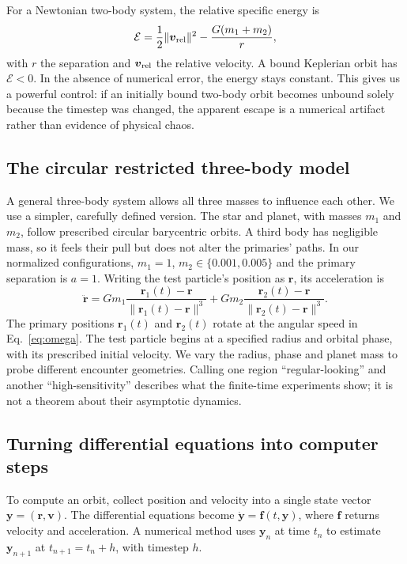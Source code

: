 \documentclass[10pt,letterpaper,twocolumn]{article}
\begin{document}
For a Newtonian two-body system, the relative specific energy is
\begin{equation}\label{eq:energy}
 \mathcal E=\frac12\lVert\boldsymbol v_{\rm rel}\rVert^2
       -\frac{G(m_1+m_2)}{r},
\end{equation}
with $r$ the separation and $\boldsymbol v_{\rm rel}$ the relative velocity. A bound Keplerian orbit has $\mathcal E<0$. In the absence of numerical error, the energy stays constant. This gives us a powerful control: if an initially bound two-body orbit becomes unbound solely because the timestep was changed, the apparent escape is a numerical artifact rather than evidence of physical chaos.

\subsection{The circular restricted three-body model}
A general three-body system allows all three masses to influence each other. We use a simpler, carefully defined version. The star and planet, with masses $m_1$ and $m_2$, follow prescribed circular barycentric orbits. A third body has negligible mass, so it feels their pull but does not alter the primaries' paths. In our normalized configurations, $m_1=1$, $m_2\in\{0.001,0.005\}$ and the primary separation is $a=1$. Writing the test particle's position as $\boldsymbol r$, its acceleration is
\begin{equation}\label{eq:restricted}
 \ddot{\boldsymbol r}=Gm_1\frac{\boldsymbol r_1(t)-\boldsymbol r}{\lVert\boldsymbol r_1(t)-\boldsymbol r\rVert^3}
 +Gm_2\frac{\boldsymbol r_2(t)-\boldsymbol r}{\lVert\boldsymbol r_2(t)-\boldsymbol r\rVert^3}.
\end{equation}
The primary positions $\boldsymbol r_1(t)$ and $\boldsymbol r_2(t)$ rotate at the angular speed in Eq.~\eqref{eq:omega}. The test particle begins at a specified radius and orbital phase, with its prescribed initial velocity. We vary the radius, phase and planet mass to probe different encounter geometries. Calling one region ``regular-looking'' and another ``high-sensitivity'' describes what the finite-time experiments show; it is not a theorem about their asymptotic dynamics.

\subsection{Turning differential equations into computer steps}
To compute an orbit, collect position and velocity into a single state vector $\boldsymbol y=(\boldsymbol r,\boldsymbol v)$. The differential equations become $\dot{\boldsymbol y}=\boldsymbol f(t,\boldsymbol y)$, where $\boldsymbol f$ returns velocity and acceleration. A numerical method uses $\boldsymbol y_n$ at time $t_n$ to estimate $\boldsymbol y_{n+1}$ at $t_{n+1}=t_n+h$, with timestep $h$.
\end{document}
